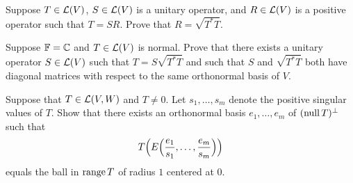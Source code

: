 \begin{exc}
\begin{exercise}
Suppose $T\in\mathcal{L}(V)$, $S\in\mathcal{L}(V)$ is a unitary operator, and $R\in\mathcal{L}(V)$
is a positive operator such that $T=SR$. Prove that $R=\sqrt{T^*T}$.
\end{exercise}

\begin{exercise}
Suppose $\mathbb{F}=\mathbb{C}$ and $T\in\mathcal{L}(V)$ is normal. Prove that there exists a unitary
operator $S\in\mathcal{L}(V)$ such that $T=S\sqrt{T^*T}$ and such that $S$ and
$\sqrt{T^*T}$ both have diagonal matrices with respect to the same orthonormal
basis of $V$.
\end{exercise}

\begin{exercise}
Suppose that $T\in\mathcal{L}(V,W)$ and $T\ne0$. Let $s_1,\dots,s_m$ denote the
positive singular values of $T$. Show that there exists an orthonormal basis
$e_1,\dots,e_m$ of $(\operatorname{null} T)^\perp$ such that
\[ T\Bigl(E\Bigl(\frac{e_1}{s_1},\dots,\frac{e_m}{s_m}\Bigr)\Bigr) \]
equals the ball in $\operatorname{range} T$ of radius $1$ centered at $0$.
\end{exercise}
\end{exc}
